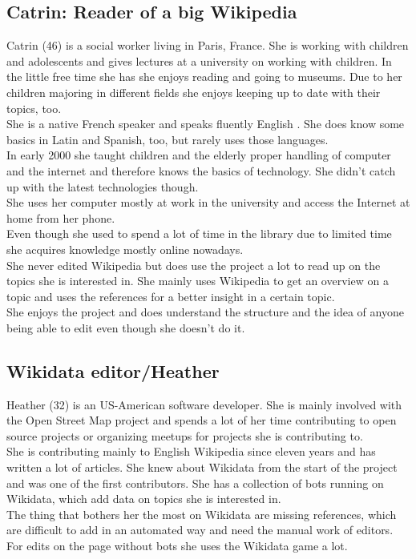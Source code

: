 \subsection{Catrin: Reader of a big Wikipedia}
Catrin (46) is a social worker living in Paris, France. She is working with children and adolescents and gives lectures at a university on working with children. In the little free time she has she enjoys reading and going to museums. Due to her children majoring in different fields she enjoys keeping up to date with their topics, too. \\
She is a native French speaker and speaks fluently English . She does know some basics in Latin and Spanish, too, but rarely uses those languages. \\
In early 2000 she taught children and the elderly proper handling of computer and the internet and therefore knows the basics of technology. She didn't catch up with the latest technologies though. \\
She uses her computer mostly at work in the university and access the Internet at home from her phone. \\
Even though she used to spend a lot of time in the library due to limited time she acquires knowledge mostly online nowadays. \\
She never edited Wikipedia but does use the project a lot to read up on the topics she is interested in. She mainly uses Wikipedia to get an overview on a topic and uses the references for a better insight in a certain topic. \\
She enjoys the project and does understand the structure and the idea of anyone being able to edit even though she doesn't do it. \\


\subsection{Wikidata editor/Heather}
Heather (32) is an US-American software developer. She is mainly involved with the Open Street Map project and spends a lot of her time contributing to open source projects or organizing meetups for projects she is contributing to. \\
She is contributing mainly to English Wikipedia since eleven years and has written a lot of articles. 
She knew about Wikidata from the start of the project and was one of the first contributors. She has a collection of bots running on Wikidata, which add data on topics she is interested in. \\
The thing that bothers her the most on Wikidata are missing references, which are difficult to add in an automated way and need the manual work of editors. For edits on the page without bots she uses the Wikidata game a lot. 

